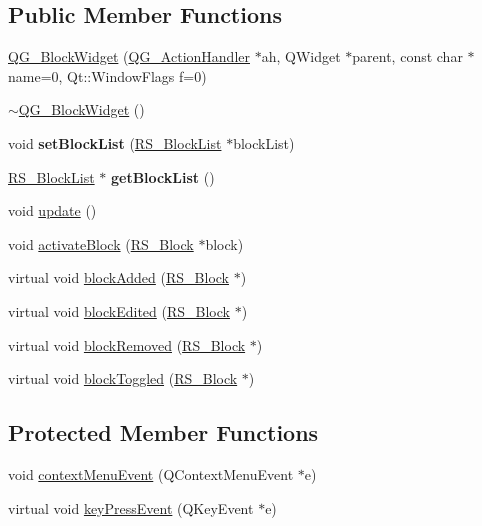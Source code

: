 \subsection*{Public Member Functions}
\begin{DoxyCompactItemize}
\item 
\hyperlink{classQG__BlockWidget_a785ad1be760206a539654f125cfe6bfc}{Q\-G\-\_\-\-Block\-Widget} (\hyperlink{classQG__ActionHandler}{Q\-G\-\_\-\-Action\-Handler} $\ast$ah, Q\-Widget $\ast$parent, const char $\ast$name=0, Qt\-::\-Window\-Flags f=0)
\item 
\hyperlink{classQG__BlockWidget_aac9227b37cff02a8964cabbd0cbccc8d}{$\sim$\-Q\-G\-\_\-\-Block\-Widget} ()
\item 
\hypertarget{classQG__BlockWidget_ad9ad3c5e08edb72fa2c2f2d3004a3c37}{void {\bfseries set\-Block\-List} (\hyperlink{classRS__BlockList}{R\-S\-\_\-\-Block\-List} $\ast$block\-List)}\label{classQG__BlockWidget_ad9ad3c5e08edb72fa2c2f2d3004a3c37}

\item 
\hypertarget{classQG__BlockWidget_a632ca3fde6015e97e48aeeb5217bd063}{\hyperlink{classRS__BlockList}{R\-S\-\_\-\-Block\-List} $\ast$ {\bfseries get\-Block\-List} ()}\label{classQG__BlockWidget_a632ca3fde6015e97e48aeeb5217bd063}

\item 
void \hyperlink{classQG__BlockWidget_a348c73c219362dd0ecb8aed78f65fe68}{update} ()
\item 
void \hyperlink{classQG__BlockWidget_a21ba65045a0b56274266f5645c002aaa}{activate\-Block} (\hyperlink{classRS__Block}{R\-S\-\_\-\-Block} $\ast$block)
\item 
virtual void \hyperlink{classQG__BlockWidget_a25d6562a145e8eb5039849acfc7081d5}{block\-Added} (\hyperlink{classRS__Block}{R\-S\-\_\-\-Block} $\ast$)
\item 
virtual void \hyperlink{classQG__BlockWidget_a6d38e6c479ab5a9b138c916e40448ec4}{block\-Edited} (\hyperlink{classRS__Block}{R\-S\-\_\-\-Block} $\ast$)
\item 
virtual void \hyperlink{classQG__BlockWidget_ad6c1a642da644216f03e6fbebf4ac6c1}{block\-Removed} (\hyperlink{classRS__Block}{R\-S\-\_\-\-Block} $\ast$)
\item 
virtual void \hyperlink{classQG__BlockWidget_afb8a75e75062026b8fbfeb9cd3ced5b4}{block\-Toggled} (\hyperlink{classRS__Block}{R\-S\-\_\-\-Block} $\ast$)
\end{DoxyCompactItemize}
\subsection*{Protected Member Functions}
\begin{DoxyCompactItemize}
\item 
void \hyperlink{classQG__BlockWidget_ab1c2b2e0da448a30d678ecb7698f23d9}{context\-Menu\-Event} (Q\-Context\-Menu\-Event $\ast$e)
\item 
virtual void \hyperlink{classQG__BlockWidget_a7fc80babd222fa506b47939c832f4e19}{key\-Press\-Event} (Q\-Key\-Event $\ast$e)
\end{DoxyCompactItemize}


